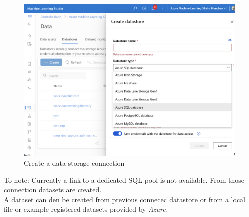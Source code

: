 \begin{figure}[H]
	\centering
	\includegraphics[scale = 0.2]{attachment/chapter_10/Scc028}
	\caption{Create a data storage connection}
\end{figure}

To note: Currently a link to a dedicated \gls{SQL} pool is not available. From those connection datasets are created.\\

A dataset can den be created from previous conneced datastore or from a local file or example registered datasets provided by \textit{Azure}.

